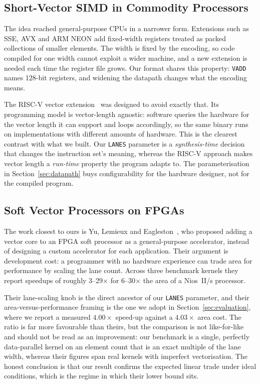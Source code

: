 \subsection{Short-Vector SIMD in Commodity Processors}
The idea reached general-purpose CPUs in a narrower form. Extensions such as
SSE, AVX and ARM NEON add fixed-width registers treated as packed collections of
smaller elements. The width is fixed by the encoding, so code compiled for one
width cannot exploit a wider machine, and a new extension is needed each time
the register file grows. Our format shares this property: \texttt{VADD} names
128-bit registers, and widening the datapath changes what the encoding means.

The RISC-V vector extension~\cite{riscvvector} was designed to avoid exactly
that. Its programming model is vector-length agnostic: software queries the
hardware for the vector length it can support and loops accordingly, so the same
binary runs on implementations with different amounts of hardware. This is the
clearest contrast with what we built. Our \texttt{LANES} parameter is a
\emph{synthesis-time} decision that changes the instruction set's meaning,
whereas the RISC-V approach makes vector length a \emph{run-time} property the
program adapts to. The parameterisation in Section~\ref{sec:datapath} buys
configurability for the hardware designer, not for the compiled program.

\subsection{Soft Vector Processors on FPGAs}
The work closest to ours is Yu, Lemieux and Eagleston~\cite{yu2008soft}, who
proposed adding a vector core to an FPGA soft processor as a general-purpose
accelerator, instead of designing a custom accelerator for each application.
Their argument is development cost: a programmer with no hardware experience can
trade area for performance by scaling the lane count. Across three benchmark
kernels they report speedups of roughly 3--29$\times$ for 6--30$\times$ the
area of a Nios~II/s processor.

Their lane-scaling knob is the direct ancestor of our \texttt{LANES} parameter,
and their area-versus-performance framing is the one we adopt in
Section~\ref{sec:evaluation}, where we report a measured $4.00\times$ speed-up
against a $4.03\times$ area cost. The ratio is far more favourable than theirs,
but the comparison is not like-for-like and should not be read as an
improvement: our benchmark is a single, perfectly data-parallel kernel on an
element count that is an exact multiple of the lane width, whereas their figures
span real kernels with imperfect vectorisation. The honest conclusion is that
our result confirms the expected linear trade under ideal conditions, which is
the regime in which their lower bound sits.
